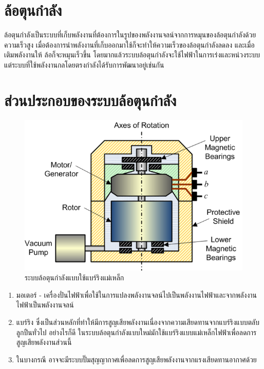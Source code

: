 \documentclass[a4paper,nobib,openany]{tufte-book}
\begin{document}
\section{ล้อตุนกำลัง}
\label{sec:orgc89da76}

ล้อตุนกำลังเป็นระบบที่เก็บพลังงานที่ต้องการในรูปของพลังงานจลน์จากการหมุนของล้อตุนกำลังด้วยความเร็วสูง เมื่อต้องการนำพลังงานที่เก็บออกมาใช้ก็จะทำให้ความเร็วของล้อตุนกำลังลดลง และเมื่อเติมพลังงานให้ ล้อก็จะหมุนเร็วขึ้น โดยมากแล้วระบบล้อตุนกำลังจะใช้ไฟฟ้าในการเร่งและหน่วงระบบ แต่ระบบที่ใช้พลังงานกลโดยตรงกำลังได้รับการพัฒนาอยู่เช่นกัน

\section{ส่วนประกอบของระบบล้อตุนกำลัง}
\label{sec:org035ed43}

\begin{figure}[htbp]
\centering
\includegraphics[width=.9\linewidth]{./pictures/flywheel-components.png}
\caption{ระบบล้อตุนกำลังแบบใช้แบร์ริงแม่เหล็ก}
\end{figure}

\begin{enumerate}
\item มอเตอร์ -
เครื่องปั่นไฟฟ้าเพื่อใช้ในการแปลงพลังงานจลน์ไปเป็นพลังงานไฟฟ้าและจากพลังงานไฟฟ้าเป็นพลังงานจลน์

\item แบร์ริง
ซึ่งเป็นส่วนหลักที่ทำให้มีการสูญเสียพลังงานเนื่องจากความเสียดทานจากแบร์ริงแบบตลับลูกปืนทั่วไป
อย่างไรก็ดี
ในระบบล้อตุนกำลังแบบใหม่มักใช้แบร์ริงแบบแม่เหล็กไฟฟ้าเพื่อลดการสูญเสียพลังงานส่วนนี้

\item ในบางกรณี
อาจจะมีระบบปั๊มสุญญากาศเพื่อลดการสูญเสียพลังงานจากแรงเสียดทานอากาศด้วย
\end{enumerate}
\end{document}
